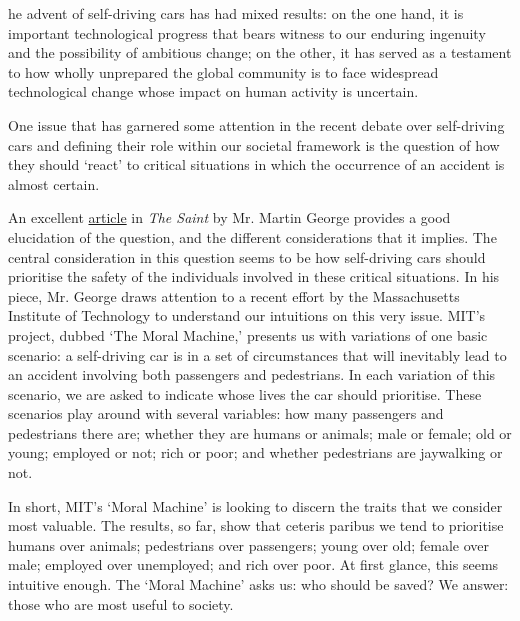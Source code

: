 \label{ch:the-ethics-of-self-driving-cars}

{\flushright{}}
\smallskip

   he advent of self-driving cars has had mixed results: on the one hand,
   it is important technological progress that bears witness to our
   enduring ingenuity and the possibility of ambitious change; on the
   other, it has served as a testament to how wholly unprepared the global
   community is to face widespread technological change whose impact on
   human activity is uncertain.

   One issue that has garnered some attention in the recent debate over
   self-driving cars and defining their role within our societal framework
   is the question of how they should `react' to critical situations in
   which the occurrence of an accident is almost certain.

   An excellent \href{http://www.thesaint-online.com/2018/11/the-moral-complexities-of-the-self-driving-car/}{article} in \emph{The Saint} by Mr. Martin George provides a
   good elucidation of the question, and the different considerations that
   it implies. The central consideration in this question seems to be how
   self-driving cars should prioritise the safety of the individuals
   involved in these critical situations. In his piece, Mr. George draws
   attention to a recent effort by the Massachusetts Institute of
   Technology to understand our intuitions on this very issue. MIT's
   project, dubbed `The Moral Machine,' presents us with variations of one
   basic scenario: a self-driving car is in a set of circumstances that
   will inevitably lead to an accident involving both passengers and
   pedestrians. In each variation of this scenario, we are asked to
   indicate whose lives the car should prioritise. These scenarios play
   around with several variables: how many passengers and pedestrians
   there are; whether they are humans or animals; male or female; old or
   young; employed or not; rich or poor; and whether pedestrians are
   jaywalking or not.

   In short, MIT's `Moral Machine' is looking to discern the traits that
   we consider most valuable. The results, so far, show that ceteris
   paribus we tend to prioritise humans over animals; pedestrians over
   passengers; young over old; female over male; employed over unemployed;
   and rich over poor. At first glance, this seems intuitive enough. The
   `Moral Machine' asks us: who should be saved? We answer: those who are
   most useful to society.

